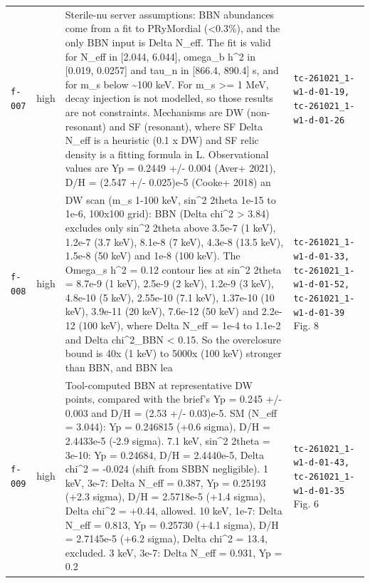 \documentclass[11pt,a4paper]{article}
\begin{document}
\begin{longtable}{@{}p{}p{}p{}p{}@{}}
\texttt{f-007} & high & Sterile-nu server assumptions: BBN abundances come from a fit to PRyMordial (\textless{}0.3\%), and the only BBN input is Delta N\_eff. The fit is valid for N\_eff in [2.044, 6.044], omega\_b h\textasciicircum{}2 in [0.019, 0.0257] and tau\_n in [866.4, 890.4] s, and for m\_s below \textasciitilde{}100 keV. For m\_s \textgreater{}= 1 MeV, decay injection is not modelled, so those results are not constraints. Mechanisms are DW (non-resonant) and SF (resonant), where SF Delta N\_eff is a heuristic (0.1 x DW) and SF relic density is a fitting formula in L. Observational values are Yp = 0.2449 +/- 0.004 (Aver+ 2021), D/H = (2.547 +/- 0.025)e-5 (Cooke+ 2018) an & \texttt{tc-261021\_\allowbreak{}1-w1-d-01-19,\allowbreak{} tc-261021\_\allowbreak{}1-w1-d-01-26} \\
\texttt{f-008} & high & DW scan (m\_s 1-100 keV, sin\textasciicircum{}2 2theta 1e-15 to 1e-6, 100x100 grid): BBN (Delta chi\textasciicircum{}2 \textgreater{} 3.84) excludes only sin\textasciicircum{}2 2theta above 3.5e-7 (1 keV), 1.2e-7 (3.7 keV), 8.1e-8 (7 keV), 4.3e-8 (13.5 keV), 1.5e-8 (50 keV) and 1e-8 (100 keV). The Omega\_s h\textasciicircum{}2 = 0.12 contour lies at sin\textasciicircum{}2 2theta = 8.7e-9 (1 keV), 2.5e-9 (2 keV), 1.2e-9 (3 keV), 4.8e-10 (5 keV), 2.55e-10 (7.1 keV), 1.37e-10 (10 keV), 3.9e-11 (20 keV), 7.6e-12 (50 keV) and 2.2e-12 (100 keV), where Delta N\_eff = 1e-4 to 1.1e-2 and \textbar{}Delta chi\textasciicircum{}2\_BBN\textbar{} \textless{} 0.15. So the overclosure bound is 40x (1 keV) to 5000x (100 keV) stronger than BBN, and BBN lea & \texttt{tc-261021\_\allowbreak{}1-w1-d-01-33,\allowbreak{} tc-261021\_\allowbreak{}1-w1-d-01-52,\allowbreak{} tc-261021\_\allowbreak{}1-w1-d-01-39} Fig. 8 \\
\texttt{f-009} & high & Tool-computed BBN at representative DW points, compared with the brief's Yp = 0.245 +/- 0.003 and D/H = (2.53 +/- 0.03)e-5. SM (N\_eff = 3.044): Yp = 0.246815 (+0.6 sigma), D/H = 2.4433e-5 (-2.9 sigma). 7.1 keV, sin\textasciicircum{}2 2theta = 3e-10: Yp = 0.24684, D/H = 2.4440e-5, Delta chi\textasciicircum{}2 = -0.024 (shift from SBBN negligible). 1 keV, 3e-7: Delta N\_eff = 0.387, Yp = 0.25193 (+2.3 sigma), D/H = 2.5718e-5 (+1.4 sigma), Delta chi\textasciicircum{}2 = +0.44, allowed. 10 keV, 1e-7: Delta N\_eff = 0.813, Yp = 0.25730 (+4.1 sigma), D/H = 2.7145e-5 (+6.2 sigma), Delta chi\textasciicircum{}2 = 13.4, excluded. 3 keV, 3e-7: Delta N\_eff = 0.931, Yp = 0.2 & \texttt{tc-261021\_\allowbreak{}1-w1-d-01-43,\allowbreak{} tc-261021\_\allowbreak{}1-w1-d-01-35} Fig. 6 \\

\end{longtable}
\end{document}
